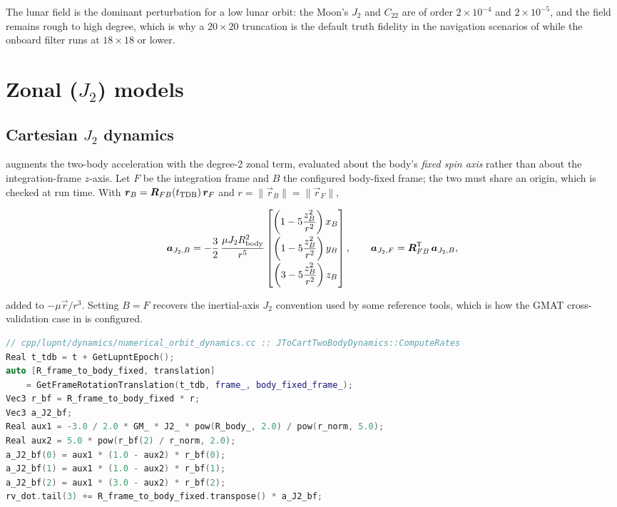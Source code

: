 \begin{lupntnote}
  The lunar field is the dominant perturbation for a low lunar orbit: the
  Moon's $J_2$ and $C_{22}$ are of order $2\times10^{-4}$ and $2\times10^{-5}$,
  and the field remains rough to high degree, which is why a $20\times20$
  truncation is the default truth fidelity in the navigation scenarios of
  \citep[Ch.~2]{iiyama2026thesis} while the onboard filter runs at $18\times18$
  or lower.
\end{lupntnote}

\section{Zonal (\texorpdfstring{$J_2$}{J2}) models}
\label{sec:dyn-j2}

\subsection{Cartesian \texorpdfstring{$J_2$}{J2} dynamics}

 augments the two-body acceleration with the degree-2
zonal term, evaluated about the body's \emph{fixed spin axis} rather than about
the integration-frame $z$-axis. Let $F$ be the integration frame and $B$ the
configured body-fixed frame; the two must share an origin, which is checked at
run time. With $\bm{r}_B = \bm{R}_{FB}(t_{\mathrm{TDB}})\,\bm{r}_F$ and
$r=\lVert\vec{r}_B\rVert=\lVert\vec{r}_F\rVert$,

\begin{equation}
  \label{eq:dyn-j2}
  \bm{a}_{J_2,B} =
  -\frac{3}{2}\,\frac{\mu J_2 R_\mathrm{body}^{2}}{r^{5}}
  \begin{bmatrix}
    \left(1 - 5\dfrac{z_B^{2}}{r^{2}}\right) x_B \\[8pt]
    \left(1 - 5\dfrac{z_B^{2}}{r^{2}}\right) y_B \\[8pt]
    \left(3 - 5\dfrac{z_B^{2}}{r^{2}}\right) z_B
  \end{bmatrix},
  \qquad
  \bm{a}_{J_2,F} = \bm{R}_{FB}^{\mathsf{T}}\,\bm{a}_{J_2,B},
\end{equation}

added to $-\mu\vec{r}/r^3$. Setting $B=F$ recovers the inertial-axis $J_2$
convention used by some reference tools, which is how the GMAT cross-validation
case in  is configured.

\begin{lstlisting}[language=cpp, caption={Body-fixed $J_2$ acceleration.}, label={lst:dyn-j2}]
// cpp/lupnt/dynamics/numerical_orbit_dynamics.cc :: JToCartTwoBodyDynamics::ComputeRates
Real t_tdb = t + GetLupntEpoch();
auto [R_frame_to_body_fixed, translation]
    = GetFrameRotationTranslation(t_tdb, frame_, body_fixed_frame_);
Vec3 r_bf = R_frame_to_body_fixed * r;
Vec3 a_J2_bf;
Real aux1 = -3.0 / 2.0 * GM_ * J2_ * pow(R_body_, 2.0) / pow(r_norm, 5.0);
Real aux2 = 5.0 * pow(r_bf(2) / r_norm, 2.0);
a_J2_bf(0) = aux1 * (1.0 - aux2) * r_bf(0);
a_J2_bf(1) = aux1 * (1.0 - aux2) * r_bf(1);
a_J2_bf(2) = aux1 * (3.0 - aux2) * r_bf(2);
rv_dot.tail(3) += R_frame_to_body_fixed.transpose() * a_J2_bf;
\end{lstlisting}

